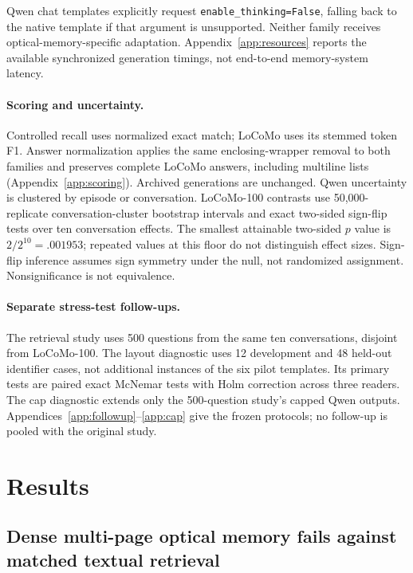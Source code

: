 \documentclass{article}
\begin{document}
Qwen chat templates explicitly request \texttt{enable\_thinking=False}, falling back to the native template if that argument is unsupported. Neither family receives optical-memory-specific adaptation. Appendix~\ref{app:resources} reports the available synchronized generation timings, not end-to-end memory-system latency.

\paragraph{Scoring and uncertainty.}
Controlled recall uses normalized exact match; LoCoMo uses its stemmed token F1. Answer normalization applies the same enclosing-wrapper removal to both families and preserves complete LoCoMo answers, including multiline lists (Appendix~\ref{app:scoring}). Archived generations are unchanged. Qwen uncertainty is clustered by episode or conversation. LoCoMo-100 contrasts use 50,000-replicate conversation-cluster bootstrap intervals and exact two-sided sign-flip tests over ten conversation effects. The smallest attainable two-sided $p$ value is $2/2^{10}=.001953$; repeated values at this floor do not distinguish effect sizes. Sign-flip inference assumes sign symmetry under the null, not randomized assignment. Nonsignificance is not equivalence.

\paragraph{Separate stress-test follow-ups.}
The retrieval study uses 500 questions from the same ten conversations, disjoint from LoCoMo-100. The layout diagnostic uses 12 development and 48 held-out identifier cases, not additional instances of the six pilot templates. Its primary tests are paired exact McNemar tests with Holm correction across three readers. The cap diagnostic extends only the 500-question study's capped Qwen outputs. Appendices~\ref{app:followup}--\ref{app:cap} give the frozen protocols; no follow-up is pooled with the original study.

\section{Results}

\subsection{Dense multi-page optical memory fails against matched textual retrieval}
\end{document}
